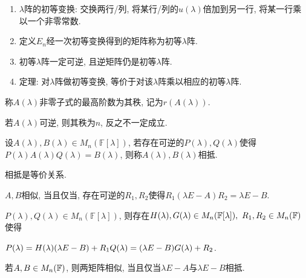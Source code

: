 \begin{example}
    \par
    \begin{enumerate}[itemindent=1em]
        \item $\lambda$阵的初等变换: 交换两行/列, 将某行/列的$u(\lambda)$倍加到另一行, 将某一行乘以一个非零常数.
        \item 定义$E_n$经一次初等变换得到的矩阵称为初等$\lambda$阵.
        \item 初等$\lambda$阵一定可逆, 且逆矩阵仍是初等$\lambda$阵.
        \item 定理: 对$\lambda$阵做初等变换, 等价于对该$\lambda$阵乘以相应的初等$\lambda$阵.
    \end{enumerate}
\end{example}

\begin{definition}
    称$A(\lambda)$非零子式的最高阶数为其秩, 记为$r(A(\lambda))$.
\end{definition}

\begin{statement}
    若$A(\lambda)$可逆, 则其秩为$n$, 反之不一定成立.
\end{statement}

\begin{definition}
    设$A(\lambda),B(\lambda)\in M_n(\mathbb{F}[\lambda])$, 若存在可逆的$P(\lambda),Q(\lambda)$使得
    $P(\lambda)A(\lambda)Q(\lambda)=B(\lambda)$, 则称$A(\lambda),B(\lambda)$相抵.\par
    相抵是等价关系.
\end{definition}

\begin{lemma}
    $A,B$相似, 当且仅当, 存在可逆的$R_1, R_2$使得$R_1(\lambda E-A)R_2=\lambda E - B$.
\end{lemma}

\begin{lemma}
    $P(\lambda),Q(\lambda)\in M_n(\mathbb{F}[\lambda])$, 
    则存在$H(\lambda),G(\lambda)\in M_n(\mathbb{F}[\lambda]),\ R_1, R_2\in M_{n}(\mathbb{F})$使得\par
    $P(\lambda)=H(\lambda)(\lambda E-B)+R_1\\Q(\lambda)=(\lambda E-B)G(\lambda)+R_2$.
\end{lemma}

\begin{theorem}[矩阵相似的充要条件]
    若$A,B\in M_{n}(\mathbb{F})$, 则两矩阵相似, 当且仅当$\lambda E-A$与$\lambda E-B$相抵.
\end{theorem}

